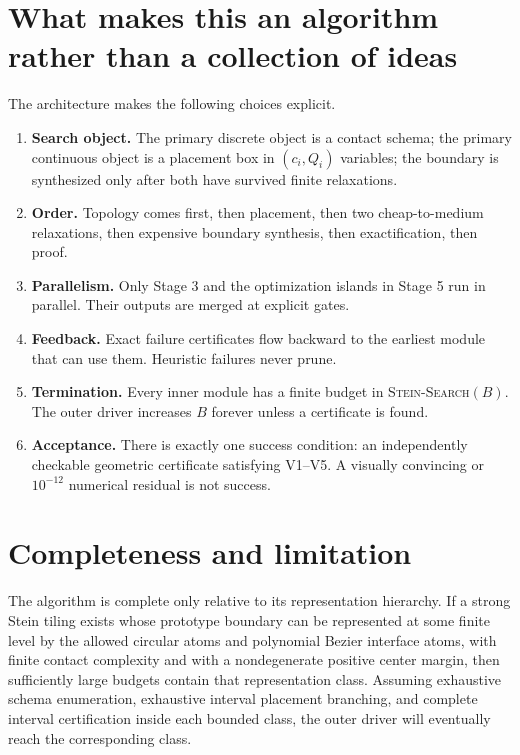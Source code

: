 \documentclass[11pt]{article}
\begin{document}
\section{What makes this an algorithm rather than a collection of ideas}

The architecture makes the following choices explicit.

\begin{enumerate}[leftmargin=9mm]
\item \textbf{Search object.} The primary discrete object is a contact schema; the primary continuous object is a placement box in $(c_i,Q_i)$ variables; the boundary is synthesized only after both have survived finite relaxations.
\item \textbf{Order.} Topology comes first, then placement, then two cheap-to-medium relaxations, then expensive boundary synthesis, then exactification, then proof.
\item \textbf{Parallelism.} Only Stage 3 and the optimization islands in Stage 5 run in parallel. Their outputs are merged at explicit gates.
\item \textbf{Feedback.} Exact failure certificates flow backward to the earliest module that can use them. Heuristic failures never prune.
\item \textbf{Termination.} Every inner module has a finite budget in \textsc{Stein-Search}$(B)$. The outer driver increases $B$ forever unless a certificate is found.
\item \textbf{Acceptance.} There is exactly one success condition: an independently checkable geometric certificate satisfying V1--V5. A visually convincing or $10^{-12}$ numerical residual is not success.
\end{enumerate}

\section{Completeness and limitation}

The algorithm is complete only relative to its representation hierarchy. If a strong Stein tiling exists whose prototype boundary can be represented at some finite level by the allowed circular atoms and polynomial Bezier interface atoms, with finite contact complexity and with a nondegenerate positive center margin, then sufficiently large budgets contain that representation class. Assuming exhaustive schema enumeration, exhaustive interval placement branching, and complete interval certification inside each bounded class, the outer driver will eventually reach the corresponding class.
\end{document}
